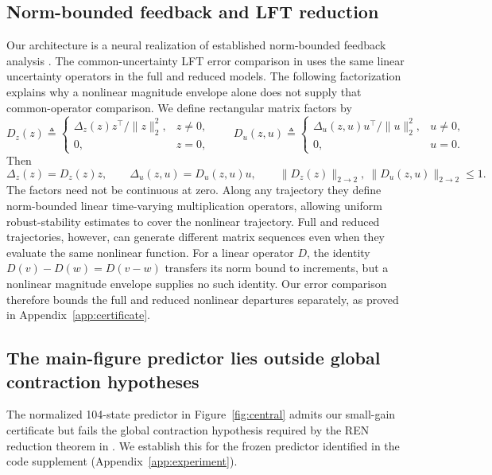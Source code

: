 \documentclass{l4dc2027}
\newcommand{\eqdef}{\triangleq}
\begin{document}
\subsection{Norm-bounded feedback and LFT reduction}\label{app:lft-comparison}
Our architecture is a neural realization of established norm-bounded feedback analysis \citep{beck-lft,lall-beck-lft}.
The common-uncertainty LFT error comparison in \citet{beck-lft} uses the same linear uncertainty operators in the full and reduced models.
The following factorization explains why a nonlinear magnitude envelope alone does not supply that common-operator comparison.
We define rectangular matrix factors by
\[
 D_z(z)\eqdef
 \begin{cases}
 \Delta_z(z)z^\top/\|z\|_2^2,&z\ne0,\\
 0,&z=0,
 \end{cases}
 \qquad
 D_u(z,u)\eqdef
 \begin{cases}
 \Delta_u(z,u)u^\top/\|u\|_2^2,&u\ne0,\\
 0,&u=0.
 \end{cases}
\]
Then
\[
 \Delta_z(z)=D_z(z)z,\qquad\Delta_u(z,u)=D_u(z,u)u,\qquad
 \|D_z(z)\|_{2\to2},\ \|D_u(z,u)\|_{2\to2}\le1.
\]
The factors need not be continuous at zero.
Along any trajectory they define norm-bounded linear time-varying multiplication operators, allowing uniform robust-stability estimates to cover the nonlinear trajectory.
Full and reduced trajectories, however, can generate different matrix sequences even when they evaluate the same nonlinear function.
For a linear operator \mbox{$D$}, the identity \mbox{$D(v)-D(w)=D(v-w)$} transfers its norm bound to increments, but a nonlinear magnitude envelope supplies no such identity.
Our error comparison therefore bounds the full and reduced nonlinear departures separately, as proved in Appendix~\ref{app:certificate}.

\subsection{The main-figure predictor lies outside global contraction hypotheses}\label{app:figure-contraction}
The normalized 104-state predictor in Figure~\ref{fig:central} admits our small-gain certificate but fails the global contraction hypothesis required by the REN reduction theorem in \citet[Theorem~2]{shakib-ren}.
We establish this for the frozen predictor identified in the code supplement (Appendix~\ref{app:experiment}).
\end{document}
